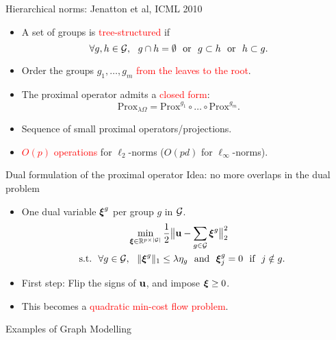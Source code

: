\documentclass[final]{beamer}
\newcommand{\rred}[1]{{\textcolor{red}{#1}}}
\begin{document}
\begin{frame}{}
\begin{columns}[T]
\begin{column}{0.315\paperwidth}
\end{column}\hfill

\begin{column}{0.315\linewidth}
\begin{block}{Hierarchical norms: Jenatton et al, ICML 2010} 
\begin{itemize}
   \item A set of groups is \rred{tree-structured} if $$\forall g,h \in {\mathcal G},~~ g \cap h = \emptyset ~~\text{or}~~ g \subset h ~~\text{or}~~ h \subset g.$$
   \item Order the groups $g_1,\ldots,g_m$ \rred{from the leaves to the root}.
   \item The proximal operator admits a \rred{closed form}: $$\text{Prox}_{\lambda\Omega} = \text{Prox}^{g_1} \circ \ldots \circ \text{Prox}^{g_m}.$$
   \item Sequence of small proximal operators/projections.
   \item \rred{$O(p)$ operations} for $\ell_2$-norms ($O(pd)$ for $\ell_\infty$-norms).
\end{itemize}
\end{block}
\begin{block}{Dual formulation of the proximal operator} 
   {\color{red} Idea: no more overlaps in the dual problem}
\begin{itemize}
\item One dual variable ${\boldsymbol\xi}^g$ per group $g$ in ${\mathcal G}$.
{\large
\begin{multline*}
\min_{{\boldsymbol\xi} \in {\mathbb R}^{p \times |{\mathcal G}|}} \frac{1}{2}\big\| {\mathbf u} - \sum_{g \in {\mathcal G}} {\boldsymbol\xi}^g \big\|_2^2 \\ ~~\text{s.t.}~~ \forall g \in {\mathcal G},~~ \|{\boldsymbol\xi}^g\|_1 \leq \lambda\eta_g ~~\text{and}~~ {\boldsymbol\xi}^g_j = 0 ~~\text{if}~~ j \notin g.
\end{multline*}
}
\item First step: Flip the signs of ${\mathbf u}$, and impose ${\boldsymbol\xi} \geq 0$.
\item This becomes a \rred{quadratic min-cost flow problem}.
\end{itemize}
\end{block}

\begin{block}{Examples of Graph Modelling}
\small{}
\end{block}



\end{column}
\end{columns}
\end{frame}
\end{document}
